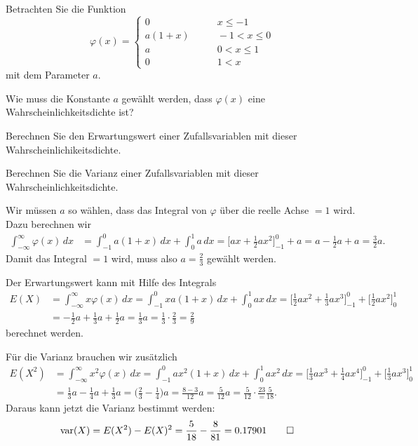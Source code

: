 Betrachten Sie die Funktion
\[
\varphi(x)
=
\begin{cases}
0     &\qquad x \le -1 \\
a(1+x)&\qquad -1<x\le 0\\
a     &\qquad 0<x\le 1\\
0     &\qquad 1< x
\end{cases}
\]
mit dem Parameter $a$.
\begin{teilaufgaben}
\item
Wie muss die Konstante $a$ gewählt werden, dass $\varphi(x)$ eine
Wahrscheinlichkeitsdichte ist?
\item
Berechnen Sie den Erwartungswert einer Zufallsvariablen mit dieser
Wahrscheinlichikeitsdichte.
\item
Berechnen Sie die Varianz einer Zufallsvariablen mit dieser
Wahrscheinlichkeitsdichte.
\end{teilaufgaben}

\begin{loesung}
\begin{teilaufgaben}
\item
Wir müssen $a$ so wählen, dass das Integral von $\varphi$ über die reelle
Achse $=1$ wird.
Dazu berechnen wir
\begin{align*}
\int_{-\infty}^\infty\varphi(x)\,dx
&=
\int_{-1}^0a(1+x)\,dx +\int_0^1 a\,dx
=
\biggl[ax+\frac12ax^2\biggr]_{-1}^0 + a
=
a-\frac12a+a=\frac32a.
\end{align*}
Damit das Integral $=1$ wird, muss also $a=\frac23$ gewählt werden.
\item
Der Erwartungswert kann mit Hilfe des Integrals
\begin{align*}
E(X)
&=
\int_{-\infty}^\infty x\varphi(x)\,dx
=
\int_{-1}^0 xa(1+x)\,dx + \int_0^1ax\,dx
=
\biggl[
\frac12ax^2+\frac13ax^3
\biggr]_{-1}^0
+
\biggl[
\frac12ax^2
\biggr]_0^1
\\
&=
-\frac12a +\frac13a +\frac12a=\frac13a=\frac13\cdot\frac23=\frac29
\end{align*}
berechnet werden.
\item
Für die Varianz brauchen wir zusätzlich
\begin{align*}
E(X^2)
&=
\int_{-\infty}^\infty x^2\varphi(x)\,dx
=
\int_{-1}^0 ax^2(1+x)\,dx +\int_0^1 ax^2\,dx
=
\biggl[
\frac13ax^3 + \frac14ax^4
\biggr]_{-1}^0
+
\biggl[
\frac13ax^3
\biggr]_0^1
\\
&=
\frac13a - \frac14a + \frac13a
=
\biggl(\frac23-\frac14)a
=
\frac{8-3}{12}a
=
\frac5{12}a=\frac5{12}\cdot\frac{23}=\frac{5}{18}.
\end{align*}
Daraus kann jetzt die Varianz bestimmt werden:
\begin{align*}
\operatorname{var}(X)
&=
E(X^2)-E(X)^2
=
\frac{5}{18}-\frac{8}{81}
=
0.17901
\qedhere
\end{align*}
\end{teilaufgaben}
\end{loesung}


